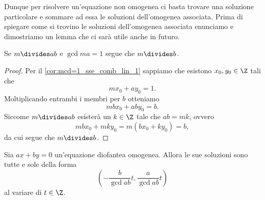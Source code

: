 Dunque per risolvere un'equazione non omogenea ci basta trovare una soluzione particolare e sommare ad essa le soluzioni dell'omogenea associata. Prima di spiegare come si trovino le soluzioni dell'omogenea associata enunciamo e dimostriamo un lemma che ci sarà utile anche in futuro.

\begin{lemma} \label{lem:divide_prod_coprimo_col_primo}
    Se $m \divides ab$ e $\gcd{m}{a} = 1$ segue che $m \divides b$.
\end{lemma}
\begin{proof}
    Per il \autoref{cor:mcd=1_sse_comb_lin_1} sappiamo che esistono $x_0, y_0 \in \Z$ tali che \[
        mx_0 + ay_0 = 1.    
    \] Moltiplicando entrambi i membri per $b$ otteniamo \[
        mbx_0 + aby_0 = b.    
    \] Siccome $m \divides ab$ esisterà un $k \in \Z$ tale che $ab = mk$, ovvero \[
        mbx_0 + mky_0 = m(bx_0 + ky_0) = b,     
    \] da cui segue che $m \divides b$.
\end{proof}

\begin{proposition}
    Sia $ax+by = 0$ un'equazione diofantea omogenea. Allora le sue soluzioni sono tutte e sole della forma \begin{equation}
        \left(-\frac{b}{\gcd{a}{b}}t, \frac{a}{\gcd{a}{b}}t \right)
    \end{equation} al variare di $t \in \Z$.
\end{proposition}